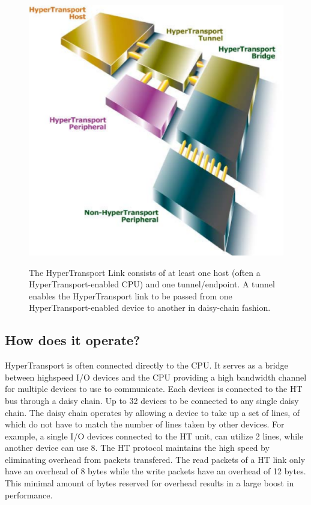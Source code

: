 \documentclass[conference]{IEEEtran}
\begin{document}
\begin{figure}[!t]
	\begin{center}
		\includegraphics[scale=.35]{htLinks}
	\end{center}
	\begin{caption}{
	 The HyperTransport Link consists of at least one host (often a
	 HyperTransport-enabled CPU) and one tunnel/endpoint. A tunnel enables the
	 HyperTransport link to be passed from one HyperTransport-enabled device to
	 another in daisy-chain fashion.
	\cite{htWhitePaper}\label{fig:htLinks}}
	\end{caption}
	
\end{figure}

\subsection{How does it operate?}
\label{subsec:ht:oper}
HyperTransport is often connected directly to the CPU. It serves as a bridge
between highspeed I/O devices and the CPU providing a high bandwidth channel for
multiple devices to use to communicate. Each devices is connected to the HT bus
through a daisy chain. Up to 32 devices to be connected to any single daisy
chain. The daisy chain operates by allowing a device to take up a set of lines,
of which do not have to match the number of lines taken by other devices. For
example, a single I/O devices connected to the HT unit, can utilize 2 lines,
while another device can use 8. 
The HT protocol maintains the high speed by eliminating overhead from packets
transfered. The read packets of a HT link only have an overhead of 8 bytes while
the write packets have an overhead of 12 bytes. This minimal amount of bytes
reserved for overhead results in a large boost in performance. 
 
\end{document}
